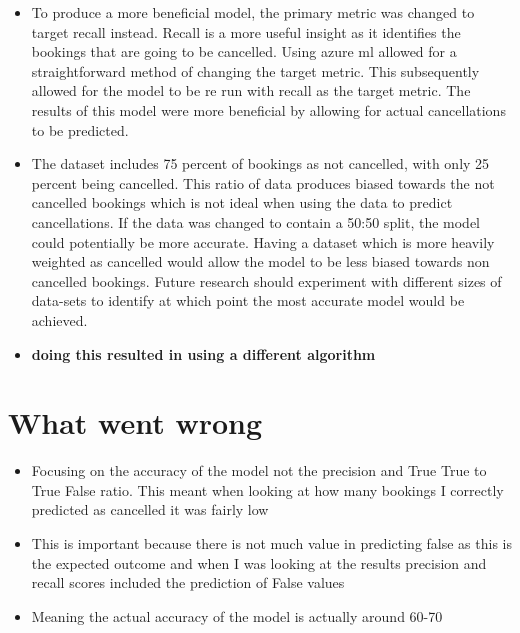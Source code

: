 \begin{itemize}
\item To produce a more beneficial model, the primary metric was changed to target recall instead. Recall is a more useful insight as it identifies the bookings that are going to be cancelled. Using azure ml allowed for a straightforward method of changing the target metric. This subsequently allowed for the model to be re run with recall as the target metric. The results of this model were more beneficial by allowing for actual cancellations to be predicted. 
\item The dataset includes 75 percent of bookings as not cancelled, with only 25 percent being cancelled. This ratio of data produces biased towards the not cancelled bookings which is not ideal when using the data to predict cancellations. If the data was changed to contain a 50:50 split, the model could potentially be more accurate. Having a dataset which is more heavily weighted as cancelled would allow the model to be less biased towards non cancelled bookings. Future research should experiment with different sizes of data-sets to identify at which point the most accurate model would be achieved. 
\item \textbf{doing this resulted in using a different algorithm}
\end{itemize}



\section{What went wrong}
\begin{itemize}
\item Focusing on the accuracy of the model not the precision and True True to True False ratio. This meant when looking at how many bookings I correctly predicted as cancelled it was fairly low
\item This is important because there is not much value in predicting false as this is the expected outcome and when I was looking at the results precision and recall scores included the prediction of False values
\item Meaning the actual accuracy of the model is actually around 60-70 
\end{itemize}



